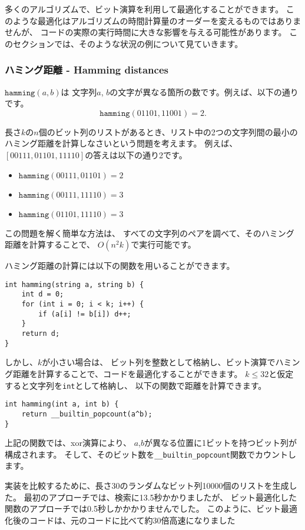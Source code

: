 多くのアルゴリズムで、ビット演算を利用して最適化することができます。
このような最適化はアルゴリズムの時間計算量のオーダーを変えるものではありませんが、
コードの実際の実行時間に大きな影響を与える可能性があります。
このセクションでは、そのような状況の例について見ていきます。

\subsubsection{ハミング距離 - Hamming distances}

$\texttt{hamming}(a,b)$は
文字列$a$, $b$の文字が異なる箇所の数です。例えば、以下の通りです。
\[\texttt{hamming}(01101,11001)=2.\]

長さ$k$の$n$個のビット列のリストがあるとき、リスト中の2つの文字列間の最小のハミング距離を計算しなさいという問題を考えます。
例えば、$[00111, 01101, 11110]$の答えは以下の通り2です。
\begin{itemize}[noitemsep]
\item $\texttt{hamming}(00111,01101)=2$
\item $\texttt{hamming}(00111,11110)=3$
\item $\texttt{hamming}(01101,11110)=3$
\end{itemize}

この問題を解く簡単な方法は、
すべての文字列のペアを調べて、そのハミング距離を計算することで、
$O(n^2 k)$で実行可能です。

ハミング距離の計算には以下の関数を用いることができます。
\begin{lstlisting}
int hamming(string a, string b) {
    int d = 0;
    for (int i = 0; i < k; i++) {
        if (a[i] != b[i]) d++;
    }
    return d;
}
\end{lstlisting}

しかし、$k$が小さい場合は、
ビット列を整数として格納し、ビット演算でハミング距離を計算することで、コードを最適化することができます。
$k \le 32$と仮定すると文字列を\texttt{int}として格納し、
以下の関数で距離を計算できます。
\begin{lstlisting}
int hamming(int a, int b) {
    return __builtin_popcount(a^b);
}
\end{lstlisting}
上記の関数では、xor演算により、
$a$,$b$が異なる位置に1ビットを持つビット列が構成されます。
そして、そのビット数を\texttt{\_\_builtin\_popcount}関数でカウントします。

実装を比較するために、長さ30のランダムなビット列10000個のリストを生成した。
最初のアプローチでは、検索に13.5秒かかりましたが、
ビット最適化した関数のアプローチでは0.5秒しかかかりませんでした。
このように、ビット最適化後のコードは、元のコードに比べて約30倍高速になりました

